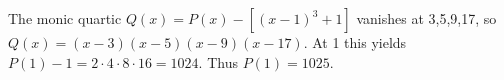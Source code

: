 The monic quartic $Q(x)=P(x)-[(x-1)^3+1]$ vanishes at 3,5,9,17, so $Q(x)=(x-3)(x-5)(x-9)(x-17)$. At 1 this yields $P(1)-1=2\cdot4\cdot8\cdot16=1024$. Thus $\boxed{P(1)=1025}$.

